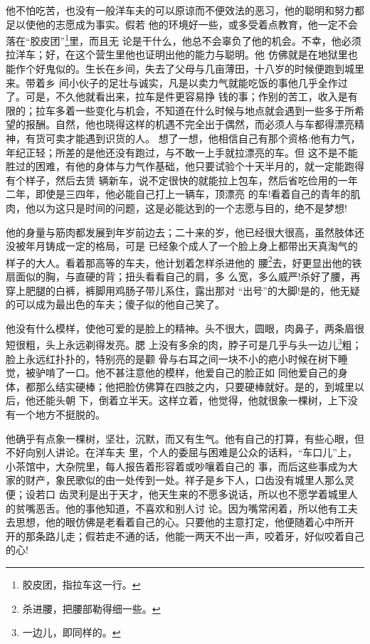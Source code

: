 \documentclass[11pt,a4paper,onecolumn]{article}
\begin{document}
他不怕吃苦，也没有一般洋车夫的可以原谅而不便效法的恶习，他的聪明和努力都足以使他的志愿成为事实。假若
他的环境好一些，或多受着点教育，他一定不会落在``胶皮团''\footnote{胶皮团，指拉车这一行。}里，而且无
论是干什么，他总不会辜负了他的机会。不幸，他必须拉洋车；好，在这个营生里他也证明出他的能力与聪明。他
仿佛就是在地狱里也能作个好鬼似的。生长在乡间，失去了父母与几亩薄田，十八岁的时候便跑到城里来。带着乡
间小伙子的足壮与诚实，凡是以卖力气就能吃饭的事他几乎全作过了。可是，不久他就看出来，拉车是件更容易挣
钱的事；作别的苦工，收入是有限的；拉车多着一些变化与机会，不知道在什么时候与地点就会遇到一些多于所希
望的报酬。自然，他也晓得这样的机遇不完全出于偶然，而必须人与车都得漂亮精神，有货可卖才能遇到识货的人。
想了一想，他相信自己有那个资格:他有力气，年纪正轻；所差的是他还没有跑过，与不敢一上手就拉漂亮的车。但
这不是不能胜过的困难，有他的身体与力气作基础，他只要试验个十天半月的，就一定能跑得有个样子，然后去赁
辆新车，说不定很快的就能拉上包车，然后省吃俭用的一年二年，即使是三四年，他必能自己打上一辆车，顶漂亮
的车!看着自己的青年的肌肉，他以为这只是时间的问题，这是必能达到的一个志愿与目的，绝不是梦想!

他的身量与筋肉都发展到年岁前边去；二十来的岁，他已经很大很高，虽然肢体还没被年月铸成一定的格局，可是
已经象个成人了\myrule 一个脸上身上都带出天真淘气的样子的大人。看着那高等的车夫，他计划着怎样杀进他的
腰\footnote{杀进腰，把腰部勒得细一些。}去，好更显出他的铁扇面似的胸，与直硬的背；扭头看看自己的肩，多
么宽，多么威严!杀好了腰，再穿上肥腿的白裤，裤脚用鸡肠子带儿系住，露出那对 ``出号''的大脚!是的，他无疑
的可以成为最出色的车夫；傻子似的他自己笑了。

他没有什么模样，使他可爱的是脸上的精神。头不很大，圆眼，肉鼻子，两条眉很短很粗，头上永远剃得发亮。腮
上没有多余的肉，脖子可是几乎与头一边儿\footnote{一边儿，即同样的。}粗；脸上永远红扑扑的，特别亮的是颧
骨与右耳之间一块不小的疤\myrule 小时候在树下睡觉，被驴啃了一口。他不甚注意他的模样，他爱自己的脸正如
同他爱自己的身体，都那么结实硬棒；他把脸仿佛算在四肢之内，只要硬棒就好。是的，到城里以后，他还能头朝
下，倒着立半天。这样立着，他觉得，他就很象一棵树，上下没有一个地方不挺脱的。

他确乎有点象一棵树，坚壮，沉默，而又有生气。他有自己的打算，有些心眼，但不好向别人讲论。在洋车夫
里，个人的委屈与困难是公众的话料，``车口儿''上，小茶馆中，大杂院里，每人报告着形容着或吵嚷着自己的
事，而后这些事成为大家的财产，象民歌似的由一处传到一处。祥子是乡下人，口齿没有城里人那么灵便；设若口
齿灵利是出于天才，他天生来的不愿多说话，所以也不愿学着城里人的贫嘴恶舌。他的事他知道，不喜欢和别人讨
论。因为嘴常闲着，所以他有工夫去思想，他的眼仿佛是老看着自己的心。只要他的主意打定，他便随着心中所开
开的那条路儿走；假若走不通的话，他能一两天不出一声，咬着牙，好似咬着自己的心!
\end{document}
